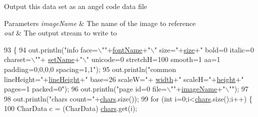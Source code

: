 Output this data set as an angel code data file


\begin{DoxyParams}{Parameters}
{\em image\+Name} & The name of the image to reference \\
\hline
{\em out} & The output stream to write to \\
\hline
\end{DoxyParams}

\begin{DoxyCode}
93                                                                    \{
94         out.println(\textcolor{stringliteral}{"info face=\(\backslash\)""}+\mbox{\hyperlink{classorg_1_1newdawn_1_1slick_1_1tools_1_1hiero_1_1_data_set_ab0f4c67d67a65d79f10572e7ce459769}{fontName}}+\textcolor{stringliteral}{"\(\backslash\)" size="}+\mbox{\hyperlink{classorg_1_1newdawn_1_1slick_1_1tools_1_1hiero_1_1_data_set_ac4d3e35615d65f0ed46ff2cea9dcc895}{size}}+\textcolor{stringliteral}{" bold=0 italic=0 charset=\(\backslash\)""}+
      \mbox{\hyperlink{classorg_1_1newdawn_1_1slick_1_1tools_1_1hiero_1_1_data_set_aa99e808e25a854b36feda6b64cb08bc9}{setName}}+\textcolor{stringliteral}{"\(\backslash\)" unicode=0 stretchH=100 smooth=1 aa=1 padding=0,0,0,0 spacing=1,1"});
95         out.println(\textcolor{stringliteral}{"common lineHeight="}+\mbox{\hyperlink{classorg_1_1newdawn_1_1slick_1_1tools_1_1hiero_1_1_data_set_adfaf42d468a6c97ab5e478c89db021d7}{lineHeight}}+\textcolor{stringliteral}{" base=26 scaleW="}+
      \mbox{\hyperlink{classorg_1_1newdawn_1_1slick_1_1tools_1_1hiero_1_1_data_set_afbd3cb40d79ad92dd8c605d1a6a9e420}{width}}+\textcolor{stringliteral}{" scaleH="}+\mbox{\hyperlink{classorg_1_1newdawn_1_1slick_1_1tools_1_1hiero_1_1_data_set_a4e81f554bbcc0c83a03123c0d84256c6}{height}}+\textcolor{stringliteral}{" pages=1 packed=0"});
96         out.println(\textcolor{stringliteral}{"page id=0 file=\(\backslash\)""}+\mbox{\hyperlink{classorg_1_1newdawn_1_1slick_1_1tools_1_1hiero_1_1_data_set_afc8adad2798f5bec23a83211af00241c}{imageName}}+\textcolor{stringliteral}{"\(\backslash\)""});
97 
98         out.println(\textcolor{stringliteral}{"chars count="}+\mbox{\hyperlink{classorg_1_1newdawn_1_1slick_1_1tools_1_1hiero_1_1_data_set_a6623d34b60d062494838b664632c15a6}{chars}}.size());
99         \textcolor{keywordflow}{for} (\textcolor{keywordtype}{int} i=0;i<\mbox{\hyperlink{classorg_1_1newdawn_1_1slick_1_1tools_1_1hiero_1_1_data_set_a6623d34b60d062494838b664632c15a6}{chars}}.size();i++) \{
100             CharData c = (CharData) \mbox{\hyperlink{classorg_1_1newdawn_1_1slick_1_1tools_1_1hiero_1_1_data_set_a6623d34b60d062494838b664632c15a6}{chars}}.get(i);

\end{DoxyCode}
